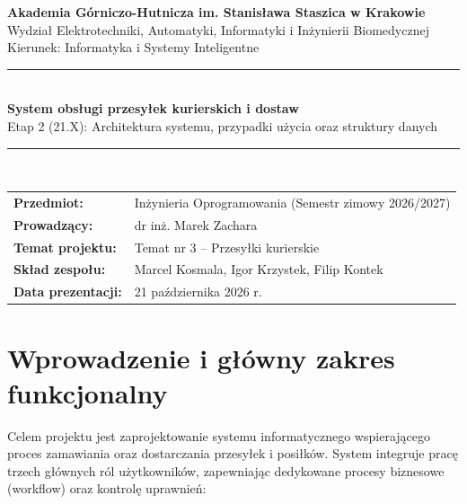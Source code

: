\documentclass[11pt,a4paper]{article}
\begin{document}
\begin{center}
    {\Large \textbf{Akademia Górniczo-Hutnicza im. Stanisława Staszica w Krakowie}}\\[0.2cm]
    {\normalsize Wydział Elektrotechniki, Automatyki, Informatyki i Inżynierii Biomedycznej}\\
    {\normalsize Kierunek: Informatyka i Systemy Inteligentne}\\[0.8cm]
    
    \rule{\textwidth}{1.2pt}\\[0.4cm]
    {\LARGE \textbf{System obsługi przesyłek kurierskich i dostaw}}\\[0.2cm]
    {\large Etap 2 (21.X): Architektura systemu, przypadki użycia oraz struktury danych}\\[0.2cm]
    \rule{\textwidth}{1.2pt}\\[0.6cm]
\end{center}

\begin{table}[H]
\centering
\renewcommand{\arraystretch}{1.25}
\begin{tabularx}{\textwidth}{>{\bfseries}l X}
    Przedmiot: & Inżynieria Oprogramowania (Semestr zimowy 2026/2027) \\
    Prowadzący: & dr inż. Marek Zachara \\
    Temat projektu: & Temat nr 3 -- Przesyłki kurierskie \\
    Skład zespołu: & Marcel Kosmala, Igor Krzystek, Filip Kontek \\
    Data prezentacji: & 21 października 2026 r. \\
\end{tabularx}
\end{table}

\vspace{0.3cm}
\tableofcontents
\newpage

\section{Wprowadzenie i główny zakres funkcjonalny}

Celem projektu jest zaprojektowanie systemu informatycznego wspierającego proces zamawiania oraz dostarczania przesyłek i posiłków. System integruje pracę trzech głównych ról użytkowników, zapewniając dedykowane procesy biznesowe (workflow) oraz kontrolę uprawnień:
\end{document}
